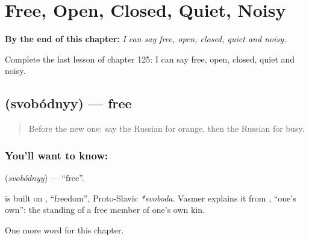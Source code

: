 
\chapter{Free, Open, Closed, Quiet, Noisy}
\label{ch:ru-free-open-closed-quiet-noisy}

\begin{chapteropening}
\textbf{By the end of this chapter:} \emph{I can say free, open, closed, quiet and noisy.}

Complete the last lesson of chapter 125: I can say free, open, closed, quiet and noisy.
\end{chapteropening}

\section[\texorpdfstring{\ru{свободный} (svobódnyy)}{свободный (svobódnyy)}]{ (svobódnyy) — free}

\label{lesson:RU-C125-free}



\begin{quote}
Before the new one: say the Russian for orange, then the Russian for busy.
\end{quote}

\subsection*{You'll want to know: }
\textbf{} (\emph{svobódnyy}) — \textquotedblleft{}free\textquotedblright{}.

\begin{cousinweb}
\textbf{} is built on \emph{}, \textquotedblleft{}freedom\textquotedblright{}, Proto-Slavic \emph{*svoboda}. Vasmer explains it from \emph{}, \textquotedblleft{}one's own\textquotedblright{}: the standing of a free member of one's own kin.
\end{cousinweb}

\begin{grammarlens}[title={What you've built}]
One more word for this chapter.
\end{grammarlens}


